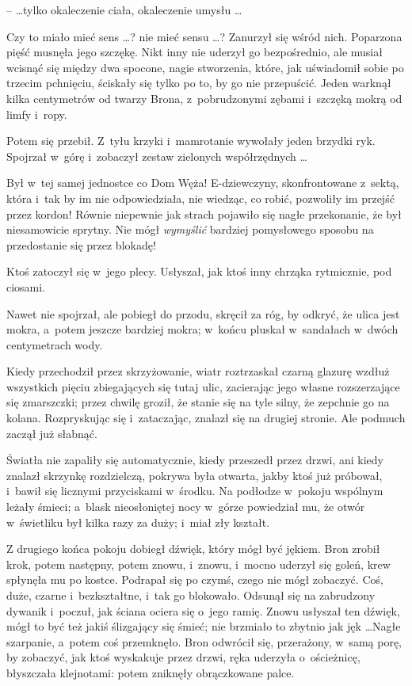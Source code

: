 \documentclass[oneside,polish,11pt,rmheadings]{mwbk}
\begin{document}
--  \ldots tylko okaleczenie ciała, okaleczenie umysłu \ldots  

Czy to miało mieć sens \ldots ? nie mieć sensu \ldots  ? Zanurzył się wśród nich. Poparzona pięść musnęła jego szczękę. Nikt inny nie uderzył go bezpośrednio, ale musiał wcisnąć się między dwa spocone, nagie stworzenia, które, jak uświadomił sobie po trzecim pchnięciu, ściskały się tylko po to, by go nie przepuścić. Jeden warknął kilka centymetrów od twarzy Brona, z~pobrudzonymi zębami i~szczęką mokrą od limfy i~ropy. 

Potem się przebił. Z~tyłu krzyki i~mamrotanie wywołały jeden brzydki ryk. Spojrzał w~górę i~zobaczył zestaw zielonych współrzędnych \ldots  

Był w~tej samej jednostce co Dom Węża! E-dziewczyny, skonfrontowane z~sektą, która i~tak by im nie odpowiedziała, nie wiedząc, co robić, pozwoliły im przejść przez kordon! Równie niepewnie jak strach pojawiło się nagłe przekonanie, że był niesamowicie sprytny. Nie mógł \textit{wymyślić }bardziej pomysłowego sposobu na przedostanie się przez blokadę! 

Ktoś zatoczył się w~jego plecy. Usłyszał, jak ktoś inny chrząka rytmicznie, pod ciosami. 

Nawet nie spojrzał, ale pobiegł do przodu, skręcił za róg, by odkryć, że ulica jest mokra, a~potem jeszcze bardziej mokra; w~końcu pluskał w~sandałach w~dwóch centymetrach wody. 

Kiedy przechodził przez skrzyżowanie, wiatr roztrzaskał czarną glazurę wzdłuż wszystkich pięciu zbiegających się tutaj ulic, zacierając jego własne rozszerzające się zmarszczki; przez chwilę groził, że stanie się na tyle silny, że zepchnie go na kolana. Rozpryskując się i~zataczając, znalazł się na drugiej stronie. Ale podmuch zaczął już słabnąć. 

Światła nie zapaliły się automatycznie, kiedy przeszedł przez drzwi, ani kiedy znalazł skrzynkę rozdzielczą, pokrywa była otwarta, jakby ktoś już próbował, i~bawił się licznymi przyciskami w~środku. Na podłodze w~pokoju wspólnym leżały śmieci; a~blask nieosłoniętej nocy w~górze powiedział mu, że otwór w~świetliku był kilka razy za duży; i~miał zły kształt. 

Z drugiego końca pokoju dobiegł dźwięk, który mógł być jękiem. Bron zrobił krok, potem następny,  potem znowu, i~znowu, i~mocno uderzył się goleń, krew spłynęła mu po kostce. Podrapał się po czymś, czego nie mógł zobaczyć. Coś, duże, czarne i~bezkształtne, i~tak go blokowało. Odsunął się na zabrudzony dywanik i~poczuł, jak ściana ociera się o~jego ramię. Znowu usłyszał ten dźwięk, mógł to być też jakiś ślizgający się śmieć; nie brzmiało to zbytnio jak jęk \ldots  Nagłe szarpanie, a~potem coś przemknęło. Bron odwrócił się, przerażony, w~samą porę, by zobaczyć, jak ktoś wyskakuje przez drzwi, ręka uderzyła o~ościeżnicę, błyszczała klejnotami: potem zniknęły obrączkowane palce. 
\end{document}
